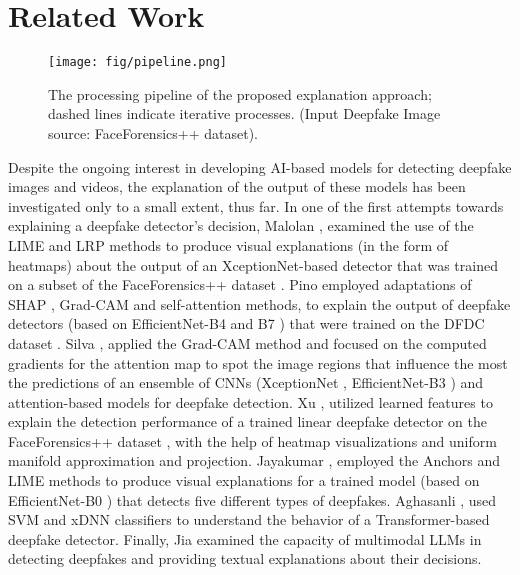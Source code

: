 \section{Related Work}
\begin{figure*}[t]
\centering
\texttt{[image: fig/pipeline.png]}
\caption{The processing pipeline of the proposed explanation approach; dashed lines indicate iterative processes. (Input Deepfake Image source: FaceForensics++ dataset).}
\label{fig:pipeline}
\end{figure*}

Despite the ongoing interest in developing AI-based models for detecting deepfake images and videos, the explanation of the output of these models has been investigated only to a small extent, thus far. In one of the first attempts towards explaining a deepfake detector's decision, Malolan \etal \cite{9092227}, examined the use of the LIME \cite{10.1145/2939672.2939778} and LRP \cite{10.1371/journal.pone.0130140} methods to produce visual explanations (in the form of heatmaps) about the output of an XceptionNet-based \cite{8099678} detector that was trained on a subset of the FaceForensics++ dataset \cite{9010912}. Pino \etal \cite{DBLP:journals/corr/abs-2105-05902} employed adaptations of SHAP \cite{10.5555/3295222.3295230}, Grad-CAM \cite{8237336} and self-attention methods, to explain the output of deepfake detectors (based on EfficientNet-B4 and B7 \cite{tan2020efficientnet}) that were trained on the DFDC dataset \cite{DFDC2020}. Silva \etal \cite{SILVA2022100217}, applied the Grad-CAM method \cite{8237336} and focused on the computed gradients for the attention map to spot the image regions that influence the most the predictions of an ensemble of CNNs (XceptionNet \cite{8099678}, EfficientNet-B3 \cite{DBLP:conf/icml/TanL19}) and attention-based models for deepfake detection. Xu \etal \cite{9707568}, utilized learned features to explain the detection performance of a trained linear deepfake detector on the FaceForensics++ dataset \cite{9010912}, with the help of heatmap visualizations and uniform manifold approximation and projection. Jayakumar \etal \cite{9993294}, employed the Anchors \cite{10.5555/3504035.3504222} and LIME \cite{10.1145/2939672.2939778} methods to produce visual explanations for a trained model (based on EfficientNet-B0 \cite{DBLP:conf/icml/TanL19}) that detects five different types of deepfakes. Aghasanli \etal \cite{10350382}, used SVM and xDNN \cite{ANGELOV2020185} classifiers to understand the behavior of a Transformer-based deepfake detector. Finally, Jia \etal \cite{Jia_2024_CVPR} examined the capacity of multimodal LLMs in detecting deepfakes and providing textual explanations about their decisions.

